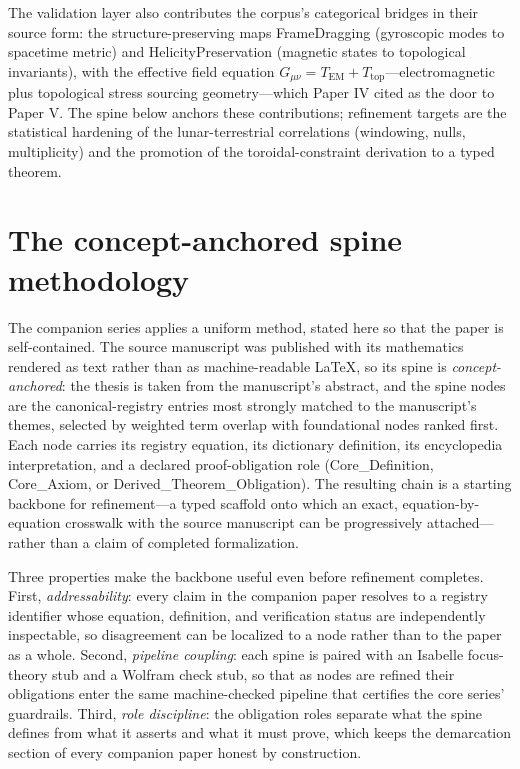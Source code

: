 \documentclass[11pt]{article}
\theoremstyle{remark}
\begin{document}
The validation layer also contributes the corpus's categorical bridges in their source form: the structure-preserving maps FrameDragging (gyroscopic modes to spacetime metric) and HelicityPreservation (magnetic states to topological invariants), with the effective field equation $G_{\mu\nu} = T_{\mathrm{EM}} + T_{\mathrm{top}}$---electromagnetic plus topological stress sourcing geometry---which Paper IV cited as the door to Paper V. The spine below anchors these contributions; refinement targets are the statistical hardening of the lunar-terrestrial correlations (windowing, nulls, multiplicity) and the promotion of the toroidal-constraint derivation to a typed theorem.

\section{The concept-anchored spine methodology}
\label{sec:method}

The companion series applies a uniform method, stated here so that the paper is self-contained. The source manuscript was published with its mathematics rendered as text rather than as machine-readable LaTeX, so its spine is \emph{concept-anchored}: the thesis is taken from the manuscript's abstract, and the spine nodes are the canonical-registry entries most strongly matched to the manuscript's themes, selected by weighted term overlap with foundational nodes ranked first. Each node carries its registry equation, its dictionary definition, its encyclopedia interpretation, and a declared proof-obligation role (Core\_Definition, Core\_Axiom, or Derived\_Theorem\_Obligation). The resulting chain is a starting backbone for refinement---a typed scaffold onto which an exact, equation-by-equation crosswalk with the source manuscript can be progressively attached---rather than a claim of completed formalization.

Three properties make the backbone useful even before refinement completes. First, \emph{addressability}: every claim in the companion paper resolves to a registry identifier whose equation, definition, and verification status are independently inspectable, so disagreement can be localized to a node rather than to the paper as a whole. Second, \emph{pipeline coupling}: each spine is paired with an Isabelle focus-theory stub and a Wolfram check stub, so that as nodes are refined their obligations enter the same machine-checked pipeline that certifies the core series' guardrails. Third, \emph{role discipline}: the obligation roles separate what the spine defines from what it asserts and what it must prove, which keeps the demarcation section of every companion paper honest by construction.
\end{document}
